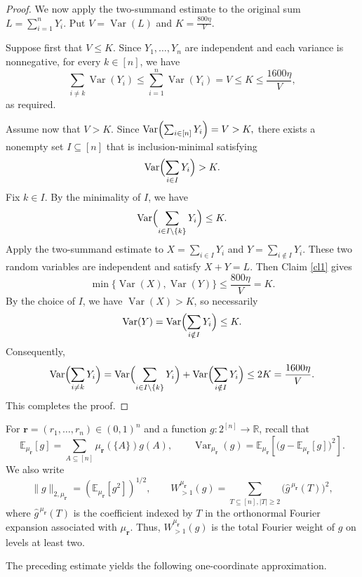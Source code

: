 \documentclass[11pt]{article}
\numberwithin{equation}{section}
\theoremstyle{definition}
\theoremstyle{remark}
\begin{document}
\begin{proof}
We now apply the two-summand estimate to the original sum
$L=\sum_{i=1}^nY_i$. Put
$
V=\operatorname{Var}(L)
$
and
$
K=\frac{800\eta}{V}.
$


Suppose first that $V\leq K$. Since $Y_1,\ldots,Y_n$ are independent and each
variance is nonnegative, for every $k\in[n]$, we have
$$
\sum_{i\neq k}\operatorname{Var}(Y_i)
\leq
\sum_{i=1}^n\operatorname{Var}(Y_i)
=V\leq K\leq \frac{1600\eta}{V},
$$
as required.

Assume now that $V>K$. Since
$
\operatorname{Var}\Bigl(\sum_{i\in[n]}Y_i\Bigr)=V>K,
$
there exists a nonempty set $I\subseteq[n]$ that is
inclusion-minimal satisfying
$$
\operatorname{Var}\Bigl(\sum_{i\in I}Y_i\Bigr)>K.
$$
Fix $k\in I$. By the minimality of $I$, we have
$$
\operatorname{Var}\Bigl(
\sum_{i\in I\setminus\{k\}}Y_i
\Bigr)\leq K.
$$
Apply the two-summand estimate to
$
X=\sum_{i\in I}Y_i
$
and
$
Y=\sum_{i\notin I}Y_i.
$
These two random variables are independent and satisfy $X+Y=L$.
Then Claim \ref{cl1} gives 
$$
\min\{\operatorname{Var}(X),\operatorname{Var}(Y)\}\leq \frac{800\eta}{V}=K.
$$
By the choice of $I$, we have $\operatorname{Var}(X)>K$, so necessarily
$$
\operatorname{Var}(Y)
=
\operatorname{Var}\Bigl(\sum_{i\notin I}Y_i\Bigr)
\leq K.
$$
Consequently,
$$
\begin{aligned}
\operatorname{Var}\Bigl(\sum_{i\neq k}Y_i\Bigr)
=
\operatorname{Var}\Bigl(
\sum_{i\in I\setminus\{k\}}Y_i
\Bigr)
+
\operatorname{Var}\Bigl(
\sum_{i\notin I}Y_i
\Bigr)\leq2K
=\frac{1600\eta}{V}.
\end{aligned}
$$
This completes the proof.
\end{proof}


For $\mathbf r=(r_1,\ldots,r_n)\in(0,1)^n$ and a function
$g:2^{[n]}\to\mathbb R$, recall that
$$
\mathbb E_{\mu_{\mathbf r}}[g]
=
\sum_{A\subseteq[n]}\mu_{\mathbf r}(\{A\})g(A),\qquad
\operatorname{Var}_{\mu_{\mathbf r}}(g)
=
\mathbb E_{\mu_{\mathbf r}}\left[
\bigl(g-\mathbb E_{\mu_{\mathbf r}}[g]\bigr)^2
\right].
$$
We also write
$$
\|g\|_{2,\mu_{\mathbf r}}
=
\left(\mathbb E_{\mu_{\mathbf r}}[g^2]\right)^{1/2},\qquad
W_{>1}^{\mu_{\mathbf r}}(g)
=
\sum_{T\subseteq[n], |T|\geq2}
\bigl(\widehat g^{\,\mu_{\mathbf r}}(T)\bigr)^2,
$$
where $\widehat g^{\,\mu_{\mathbf r}}(T)$ is the coefficient indexed
by $T$ in the orthonormal Fourier expansion associated with
$\mu_{\mathbf r}$. Thus, $W_{>1}^{\mu_{\mathbf r}}(g)$ is the total
Fourier weight of $g$ on levels at least two.

The preceding estimate yields the following one-coordinate approximation.
\end{document}
